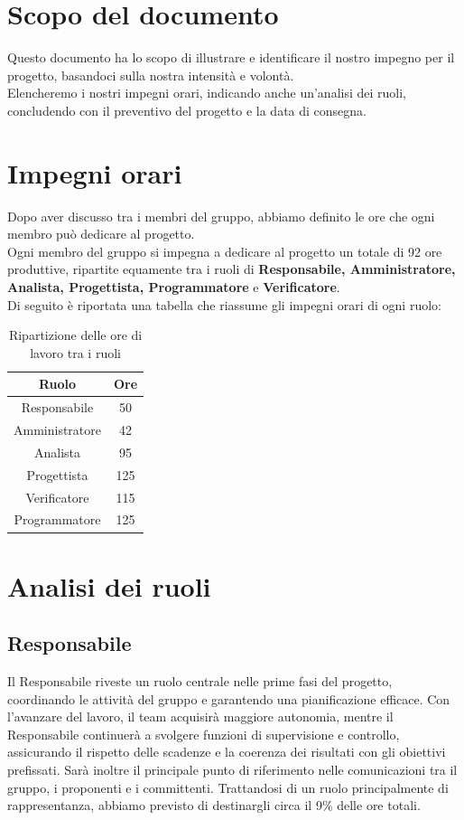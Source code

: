 \documentclass{article}
\begin{document}
	\section{Scopo del documento}
	Questo documento ha lo scopo di illustrare e identificare il nostro impegno per il progetto, basandoci sulla nostra intensità e volontà.\\
	Elencheremo i nostri impegni orari, indicando anche un'analisi dei ruoli, concludendo con il preventivo del progetto e la data di consegna.
	
	\section{Impegni orari}
	Dopo aver discusso tra i membri del gruppo, abbiamo definito le ore che ogni membro può dedicare al progetto.\\
	Ogni membro del gruppo si impegna a dedicare al progetto un totale di 92 ore produttive, ripartite equamente tra i ruoli di \textbf{Responsabile, Amministratore, Analista, Progettista, Programmatore} e \textbf{Verificatore}.\\
	Di seguito è riportata una tabella che riassume gli impegni orari di ogni ruolo:	
	
	\begin{table}[h!]
		\centering
		\begin{tabular}{|c|c|}
			\hline
			\rowcolor{gray!25}
			Ruolo & Ore \\ \hline
			Responsabile & 50 \\ \hline
			Amministratore & 42 \\ \hline
			Analista & 95 \\ \hline
			Progettista & 125 \\ \hline
			Verificatore & 115 \\ \hline
			Programmatore & 125 \\ \hline
		\end{tabular}
		\caption{Ripartizione delle ore di lavoro tra i ruoli}
	\end{table}
	
	\section{Analisi dei ruoli}
	\subsection{Responsabile}
	Il Responsabile riveste un ruolo centrale nelle prime fasi del progetto, coordinando le attività del gruppo e garantendo una pianificazione efficace.
	Con l’avanzare del lavoro, il team acquisirà maggiore autonomia, mentre il Responsabile continuerà a svolgere funzioni di supervisione e controllo, assicurando il rispetto delle scadenze e la coerenza dei risultati con gli obiettivi prefissati.
	Sarà inoltre il principale punto di riferimento nelle comunicazioni tra il gruppo, i proponenti e i committenti.
	Trattandosi di un ruolo principalmente di rappresentanza, abbiamo previsto di destinargli circa il 9\% delle ore totali.
	
\end{document}
